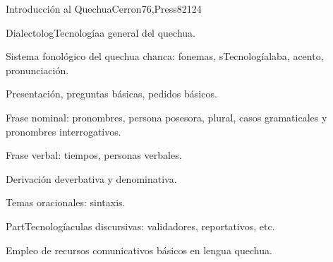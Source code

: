 \begin{syllabus}
\begin{competences}
    \item {}
    \item {}
    \item {}
    \item {}
\end{competences}

\begin{unit}{Introducción al Quechua}{}{Cerron76,Press82}{12}{4}
   \begin{topics}
      \item DialectologTecnologíaa general del quechua.
      \item Sistema fonológico del quechua chanca: fonemas, sTecnologíalaba, acento, pronunciación.
      \item Presentación, preguntas básicas, pedidos básicos.
      \item Frase nominal: pronombres, persona posesora, plural, casos gramaticales y pronombres interrogativos.
      \item Frase verbal: tiempos, personas verbales.
      \item Derivación deverbativa y denominativa.
      \item Temas oracionales: sintaxis.
      \item PartTecnologíaculas discursivas: validadores, reportativos, etc.
                
   \end{topics}

   \begin{learningoutcomes}
      \item Empleo de recursos comunicativos básicos en lengua quechua.
   \end{learningoutcomes}
\end{unit}



\begin{coursebibliography}
\end{coursebibliography}

\end{syllabus}

